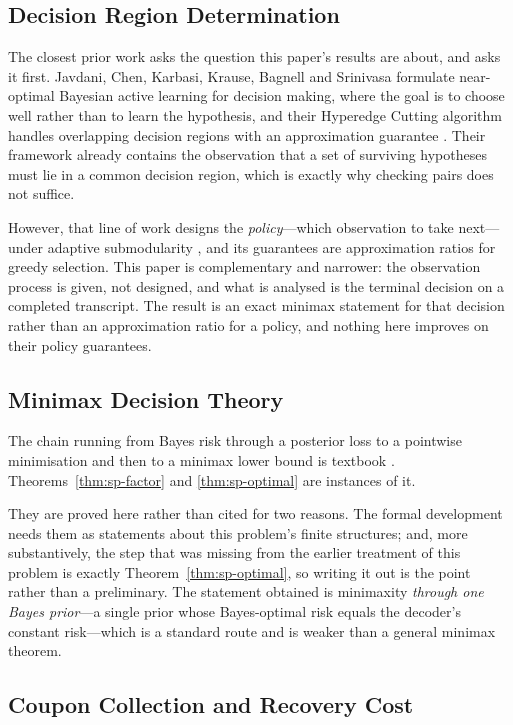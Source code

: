 \subsection{Decision Region Determination}

The closest prior work asks the question this paper's results are about, and asks it first.
Javdani, Chen,
Karbasi, Krause, Bagnell and Srinivasa formulate near-optimal Bayesian active learning for
decision making, where the goal is to choose well rather than to learn the hypothesis, and
their Hyperedge Cutting algorithm handles overlapping decision regions with an approximation
guarantee \cite{javdani2014}. Their framework already contains the observation that a set of
surviving hypotheses must lie in a common decision region, which is exactly why checking pairs
does not suffice.

However, that line of work designs the \emph{policy}---which observation to take next---under
adaptive submodularity \cite{golovin2011}, and its guarantees are approximation ratios for
greedy selection. This paper is complementary and narrower: the observation process is given,
not designed, and what is analysed is the terminal decision on a completed transcript. The
result is an exact minimax statement for that decision rather than an approximation ratio for
a policy, and nothing here improves on their policy guarantees.

\subsection{Minimax Decision Theory}

The chain running from Bayes risk through a posterior loss to a pointwise minimisation and
then to a minimax lower bound is textbook \cite{lehmann1998,wald1950}.
Theorems~\ref{thm:sp-factor} and \ref{thm:sp-optimal} are instances of it.

They are proved here rather than cited for two reasons. The formal development needs them as
statements about this problem's finite structures; and, more substantively, the step that was
missing from the earlier treatment of this problem is exactly
Theorem~\ref{thm:sp-optimal}, so writing it out is the point rather than a preliminary. The
statement obtained is minimaxity \emph{through one Bayes prior}---a single prior whose
Bayes-optimal risk equals the decoder's constant risk---which is a standard route and is
weaker than a general minimax theorem.

\subsection{Coupon Collection and Recovery Cost}

